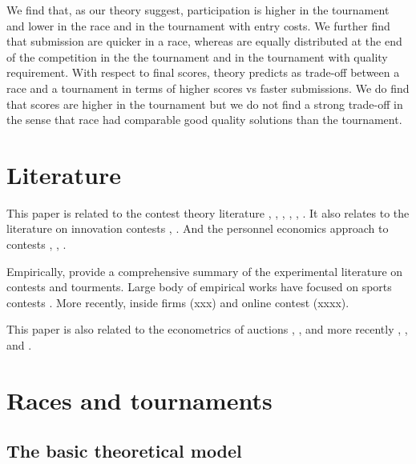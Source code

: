 \documentclass[12pt,]{article}
\begin{document}
We find that, as our theory suggest, participation is higher in the
tournament and lower in the race and in the tournament with entry costs.
We further find that submission are quicker in a race, whereas are
equally distributed at the end of the competition in the the tournament
and in the tournament with quality requirement. With respect to final
scores, theory predicts as trade-off between a race and a tournament in
terms of higher scores vs faster submissions. We do find that scores are
higher in the tournament but we do not find a strong trade-off in the
sense that race had comparable good quality solutions than the
tournament.

\section{Literature}\label{literature}

This paper is related to the contest theory literature
\citet{dixit1987strategic} \citet{baye2003strategic},
\citet{parreiras2010contests}, \citet{moldovanu2001optimal},
\citet{moldovanu2006contest}, \citet{siegel2009all},
\citet{siegel2014contests}. It also relates to the literature on
innovation contests \citet{taylor1995digging}, \citet{che2003optimal}.
And the personnel economics approach to contests \citet{lazear1981rank},
\citet{green1983comparison}, \citet{mary1984economic}.

Empirically, \citet{dechenaux2014survey} provide a comprehensive summary
of the experimental literature on contests and tourments. Large body of
empirical works have focused on sports contests
\citet{szymanski2003economic}. More recently, inside firms (xxx) and
online contest (xxxx).

This paper is also related to the econometrics of auctions
\citet{paarsch1992deciding}, \citet{laffont1995econometrics},
\citet{donald1996identification} and more recently
\citet{athey2011comparing}, \citet{athey2002identification}, and
\citet{athey2007nonparametric}.

\section{Races and tournaments}\label{races-and-tournaments}

\subsection{The basic theoretical
model}\label{the-basic-theoretical-model}
\end{document}
